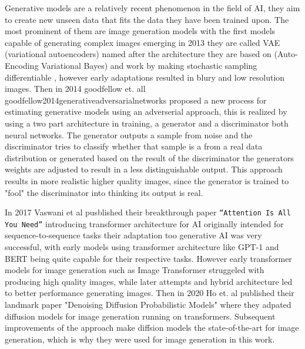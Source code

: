 Generative models are a relatively recent phenomenon in the field of AI, they aim to create new unseen data that fits the data they have been trained upon. The most prominent of them are image generation models with the first models capable of generating complex images emerging in 2013 they are called VAE (variational autoencoders) named after the architecture they are based on (Auto-Encoding Variational Bayes) and work by making stochastic sampling differentiable \cite{kingma2022autoencodingvariationalbayes}, however early adaptations resulted in blury and low resolution images.
Then in 2014 goodfellow et. all {goodfellow2014generativeadversarialnetworks} proposed a new process for estimating generative models using an adverserial approach, this is realized by using a two part architecture in training, a generator and a discriminator both neural networks. The generator outputs a sample from noise and the discriminator tries to classify whether that sample is a from a real data distribution or generated based on the result of the discriminator the generators weights are adjusted to result in a less distinguishable output. This approach results in more realistic higher quality images, since the generator is trained to "fool" the discriminator into thinking its output is real. 

In 2017 Vaswani et al pusblished their breakthrough paper \verb|“Attention Is All You Need”| \cite{vaswani2023attentionneed} introducing transformer architecture for AI %
originally intended for sequence-to-sequence tasks their adaptation too generative AI was very successful, with early models using transformer architecture like GPT-1 \cite{GPT-1} and BERT \cite{devlin2019bertpretrainingdeepbidirectional} being quite capable for their respective tasks. However early transformer models for image generation such as Image Transformer \cite{parmar2018imagetransformer} struggeled with producing high quality images, while later attempts and hybrid architecture led to better performance generating images. Then in 2020 Ho et. al published their landmark paper "Denoising Diffusion Probabilistic Models" where they adpated diffusion models for image generation running on transformers.
Subsequent improvements of the approach make diffsion models the state-of-the-art for image generation, which is why they were used for image generation in this work. %


